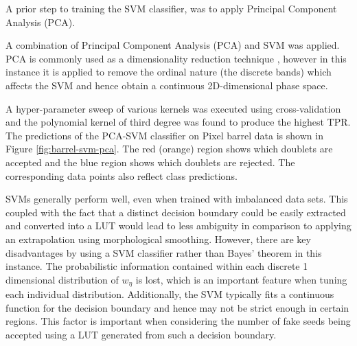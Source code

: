

A prior step to training the SVM classifier, was to apply Principal Component Analysis (PCA).

A combination of Principal Component Analysis (PCA) and SVM was applied. PCA is commonly used as a dimensionality reduction technique \cite{pca}, however in this instance it is applied to remove the ordinal nature (the discrete bands) which affects the SVM and hence obtain a continuous 2D-dimensional phase space. 


A hyper-parameter sweep of various kernels was executed using cross-validation and the polynomial kernel of third degree was found to produce the highest TPR. The predictions of the PCA-SVM classifier on Pixel barrel data is shown in Figure \ref{fig:barrel-svm-pca}. The red (orange) region shows which doublets are accepted and the blue region shows which doublets are rejected. The corresponding data points also reflect class predictions. 

SVMs generally perform well, even when trained with imbalanced data sets. This coupled with the fact that a distinct decision boundary could be easily extracted and converted into a LUT would lead to less ambiguity in comparison to applying an extrapolation using morphological smoothing. However, there are key disadvantages by using a SVM classifier rather than Bayes' theorem in this instance. The probabilistic information contained within each discrete 1 dimensional distribution of $w_{\eta}$ is lost, which is an important feature when tuning each individual distribution. Additionally, the SVM typically fits a continuous function for the decision boundary and hence may not be strict enough in certain regions. This factor is important when considering the number of fake seeds being accepted using a LUT generated from such a decision boundary. 



